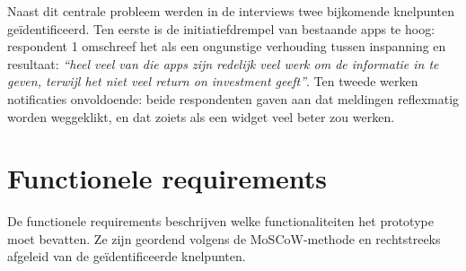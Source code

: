 Naast dit centrale probleem werden in de interviews twee bijkomende knelpunten
geïdentificeerd. Ten eerste is de initiatiefdrempel van bestaande apps te hoog:
respondent 1 omschreef het als een ongunstige verhouding tussen inspanning en
resultaat: \textit{``heel veel van die apps zijn redelijk veel werk om de
informatie in te geven, terwijl het niet veel return on investment geeft''}. Ten
tweede werken notificaties onvoldoende: beide respondenten gaven aan dat
meldingen reflexmatig worden weggeklikt, en dat zoiets als een widget veel beter zou werken.

\section{Functionele requirements}

De functionele requirements beschrijven welke functionaliteiten het prototype
moet bevatten. Ze zijn geordend volgens de MoSCoW-methode en rechtstreeks
afgeleid van de geïdentificeerde knelpunten.

